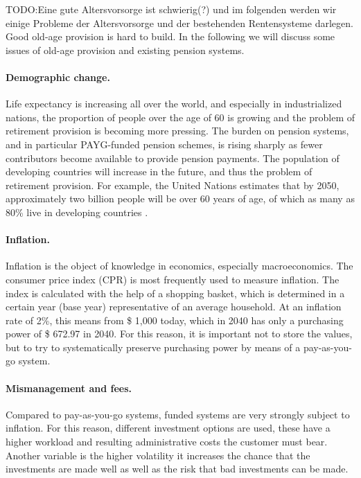 TODO:Eine gute Altersvorsorge ist schwierig(?) und im folgenden werden wir einige Probleme der Altersvorsorge und der bestehenden Rentensysteme darlegen.
Good old-age provision is hard to build. In the following we will discuss some issues of old-age provision and existing pension systems.

\paragraph{Demographic change.} Life expectancy is increasing all over the world, and especially in industrialized nations, the proportion of people over the age of 60 is growing and the problem of retirement provision is becoming more pressing. The burden on pension systems, and in particular PAYG-funded pension schemes, is rising sharply as fewer contributors become available to provide pension payments. The population of developing countries will increase in the future, and thus the problem of retirement provision. For example, the United Nations estimates that by 2050, approximately two billion people will be over 60 years of age, of which as many as 80\% live in developing countries
\cite{noauthor_pensions_2009}.



\paragraph{Inflation.}  Inflation is the object of knowledge in economics, especially macroeconomics. The consumer price index (CPR) is most frequently used to measure inflation. The index is calculated with the help of a shopping basket, which is determined in a certain year (base year) representative of an average household. 
At an inflation rate of 2\%, this means from \$ 1,000 today, which in 2040 has only a purchasing power of \$ 672.97 in 2040. 
For this reason, it is important not to store the values, but to try to systematically preserve purchasing power by means of a pay-as-you-go system.

\paragraph{Mismanagement and fees.} Compared to pay-as-you-go systems, funded systems are very strongly subject to inflation. For this reason, different investment options are used, these have a higher workload and resulting administrative costs the customer must bear. Another variable is the higher volatility it increases the chance that the investments are made well as well as the risk that bad investments can be made.

